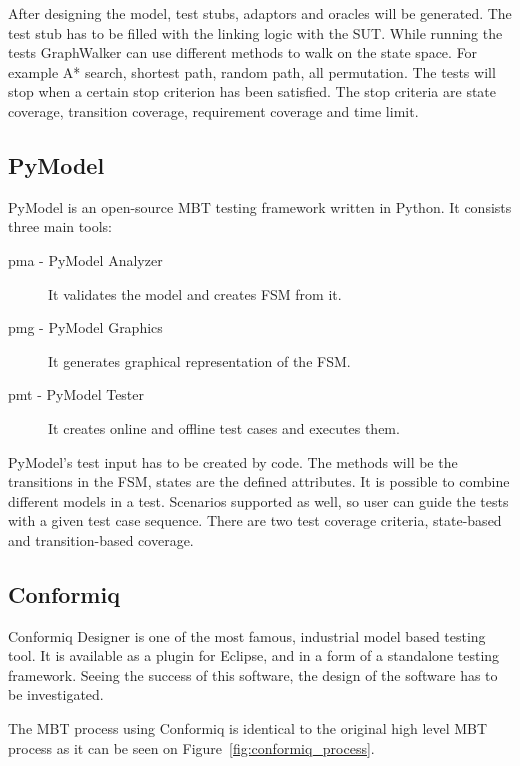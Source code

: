 After designing the model, test stubs, adaptors and oracles will be generated. The test stub has to be filled with the linking logic with the SUT. While running the tests GraphWalker can use different methods to walk on the state space. For example A* search, shortest path, random path, all permutation. The tests will stop when a certain stop criterion has been satisfied. The stop criteria are state coverage, transition coverage, requirement coverage and time limit.


\subsection{PyModel}
\label{sub:pymodel}

PyModel \cite{pymodelarticle}\cite{pymodel} is an open-source MBT testing framework written in Python. It consists three main tools:

\begin{description}
	\item[pma - PyModel Analyzer] It validates the model and creates FSM from it.
    \item[pmg - PyModel Graphics] It generates graphical representation of the FSM.
    \item[pmt - PyModel Tester] It creates online and offline test cases and executes them.
\end{description}

PyModel's test input has to be created by code. The methods will be the transitions in the FSM, states are the defined attributes. It is possible to combine different models in a test. Scenarios supported as well, so user can guide the tests with a given test case sequence. There are two test coverage criteria, state-based and transition-based coverage.


\subsection{Conformiq}
\label{sub:conformiq}

Conformiq Designer is one of the most famous, industrial model based testing tool. It is available as a plugin for Eclipse, and in a form of a standalone testing framework. Seeing the success of this software, the design of the software has to be investigated.

The MBT process using Conformiq is identical to the original high level MBT process as it can be seen on Figure~\ref{fig:conformiq_process}.

